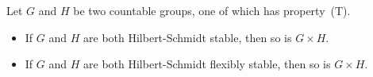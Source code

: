 \begin{theorem}\label{thm:stability_direct_product_simple} Let $G$ and $H$ be two countable groups, one of which has property~(T).\enlargethispage{.5\baselineskip}

\begin{itemize}
\item
If $G$ and $H$ are both Hilbert-Schmidt stable, then so is $G\times H$.

\item
If $G$ and $H$ are both Hilbert-Schmidt flexibly stable, then so is $G\times H$.
\end{itemize}
\end{theorem}
